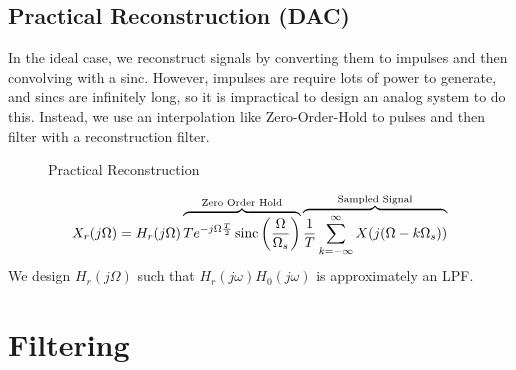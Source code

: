 \subsection{Practical Reconstruction (DAC)}
In the ideal case, we reconstruct signals by converting them to impulses and then convolving with a sinc.
However, impulses are require lots of power to generate, and sincs are infinitely long, so it is impractical to design an analog system to do this.
Instead, we use an interpolation like Zero-Order-Hold to pulses and then filter with a reconstruction filter.
\begin{gitbook-image}
\begin{figure}[!h]
  \centering
  \caption{Practical Reconstruction}
  \label{fig:reconstruction}
\end{figure}
\end{gitbook-image}
\[
  X_r(j\Omega) = H_r(j\Omega)\overbrace{Te^{-j\Omega\frac{T}{2}}\operatorname*{sinc}\left(\frac{\Omega}{\Omega_s}\right)}^{\text{Zero Order Hold}}\overbrace{\frac{1}{T}\sum_{k=-\infty}^{\infty}X(j(\Omega-k\Omega_s))}^{\text{Sampled Signal}}
\]
We design $H_r(j\Omega)$ such that $H_r(j\omega)H_0(j\omega)$ is approximately an LPF.
\section{Filtering}

